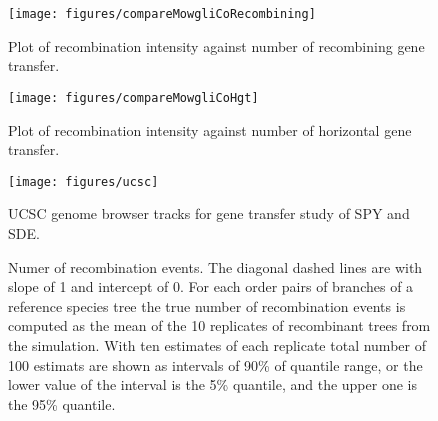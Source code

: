\documentclass[english]{article}
\begin{document}
\begin{figure}
\begin{center}
\texttt{[image: figures/compareMowgliCoRecombining]}
\end{center}
\caption{\label{fig:cmpcomowgli}Plot of recombination intensity against number
of recombining gene transfer.}
\end{figure}
\clearpage{}

\begin{figure}
\begin{center}
\texttt{[image: figures/compareMowgliCoHgt]}
\end{center}
\caption{\label{fig:cmpcomowglihgt}Plot of recombination intensity against number
of horizontal gene transfer.}
\end{figure}
\clearpage{}

\begin{figure}
\texttt{[image: figures/ucsc]}
\caption{\label{fig:ucsc}UCSC genome browser tracks for gene transfer study of
SPY and SDE.}
\end{figure}
\clearpage{}%

\begin{figure}
\caption{\label{fig:h1}Numer of recombination events. The diagonal dashed
lines are with slope of 1 and intercept of 0. For each order
pairs of branches of a reference species tree the true number of recombination
events is computed as the mean of the 10 replicates of recombinant
trees from the simulation. With ten estimates of each replicate total
number of 100 estimats are shown as intervals of 90\% of quantile
range, or the lower value of the interval is the 5\% quantile, and
the upper one is the 95\% quantile. }
\end{figure}
\clearpage{}%
\end{document}

